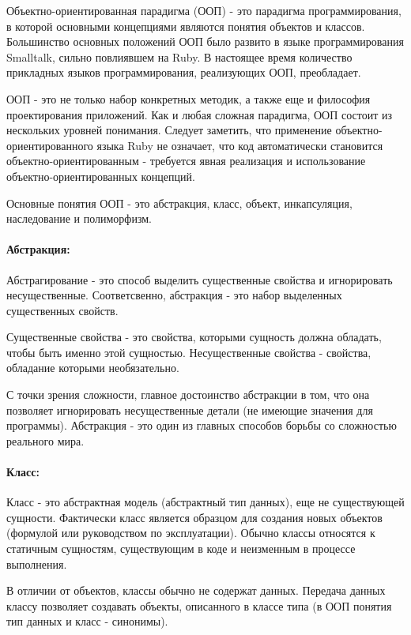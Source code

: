 Объектно-ориентированная парадигма (ООП) - это парадигма программирования, в которой основными концепциями являются понятия объектов и классов. Большинство основных положений ООП было развито в языке программирования Smalltalk, сильно повлиявшем на Ruby. В настоящее время количество прикладных языков программирования, реализующих ООП, преобладает.

ООП - это не только набор конкретных методик, а также еще и философия проектирования приложений. Как и любая сложная парадигма, ООП состоит из нескольких уровней понимания. Следует заметить, что применение объектно-ориентированного языка Ruby не означает, что код автоматически становится объектно-ориентированным - требуется явная реализация и использование объектно-ориентированных концепций.

Основные понятия ООП - это абстракция, класс, объект, инкапсуляция, наследование и полиморфизм.

\paragraph*{Абстракция:}

Абстрагирование - это способ выделить существенные свойства и игнорировать несущественные. Соответсвенно, абстракция - это набор выделенных существенных свойств.

Существенные свойства - это свойства, которыми сущность должна обладать, чтобы быть именно этой сущностью. Несущественные свойства - свойства, обладание которыми необязательно.

С точки зрения сложности, главное достоинство абстракции в том, что она позволяет игнорировать несущественные детали (не имеющие значения для программы). Абстракция - это один из главных способов борьбы со сложностью реального мира.

\paragraph*{Класс:}

Класс - это абстрактная модель (абстрактный тип данных), еще не существующей сущности. Фактически класс является образцом для создания новых объектов (формулой или руководством по эксплуатации). Обычно классы относятся к статичным сущностям, существующим в коде и неизменным в процессе выполнения.

В отличии от объектов, классы обычно не содержат данных. Передача данных классу позволяет создавать объекты, описанного в классе типа (в ООП понятия тип данных и класс - синонимы).

